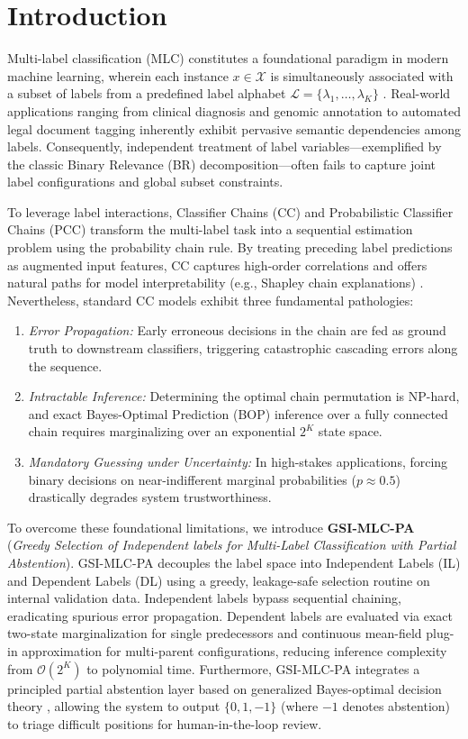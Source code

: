 \documentclass[conference]{IEEEtran}
\begin{document}
\section{Introduction}
Multi-label classification (MLC) constitutes a foundational paradigm in modern machine learning, wherein each instance $x \in \mathcal{X}$ is simultaneously associated with a subset of labels from a predefined label alphabet $\mathcal{L} = \{\lambda_1, \dots, \lambda_K\}$ \cite{zhang2018binary, read2011classifier}. Real-world applications ranging from clinical diagnosis and genomic annotation to automated legal document tagging inherently exhibit pervasive semantic dependencies among labels. Consequently, independent treatment of label variables—exemplified by the classic Binary Relevance (BR) decomposition—often fails to capture joint label configurations and global subset constraints.

To leverage label interactions, Classifier Chains (CC) \cite{read2011classifier} and Probabilistic Classifier Chains (PCC) \cite{cheng2010bayes} transform the multi-label task into a sequential estimation problem using the probability chain rule. By treating preceding label predictions as augmented input features, CC captures high-order correlations and offers natural paths for model interpretability (e.g., Shapley chain explanations) \cite{read2011classifier}. Nevertheless, standard CC models exhibit three fundamental pathologies:
\begin{enumerate}
    \item \textit{Error Propagation:} Early erroneous decisions in the chain are fed as ground truth to downstream classifiers, triggering catastrophic cascading errors along the sequence.
    \item \textit{Intractable Inference:} Determining the optimal chain permutation is NP-hard, and exact Bayes-Optimal Prediction (BOP) inference over a fully connected chain requires marginalizing over an exponential $2^K$ state space.
    \item \textit{Mandatory Guessing under Uncertainty:} In high-stakes applications, forcing binary decisions on near-indifferent marginal probabilities ($p \approx 0.5$) drastically degrades system trustworthiness.
\end{enumerate}

To overcome these foundational limitations, we introduce \textbf{GSI-MLC-PA} (\textit{Greedy Selection of Independent labels for Multi-Label Classification with Partial Abstention}). GSI-MLC-PA decouples the label space into Independent Labels (IL) and Dependent Labels (DL) using a greedy, leakage-safe selection routine on internal validation data. Independent labels bypass sequential chaining, eradicating spurious error propagation. Dependent labels are evaluated via exact two-state marginalization for single predecessors and continuous mean-field plug-in approximation for multi-parent configurations, reducing inference complexity from $\mathcal{O}(2^K)$ to polynomial time. Furthermore, GSI-MLC-PA integrates a principled partial abstention layer based on generalized Bayes-optimal decision theory \cite{nguyen2021multilabel}, allowing the system to output $\{0, 1, -1\}$ (where $-1$ denotes abstention) to triage difficult positions for human-in-the-loop review.
\end{document}
